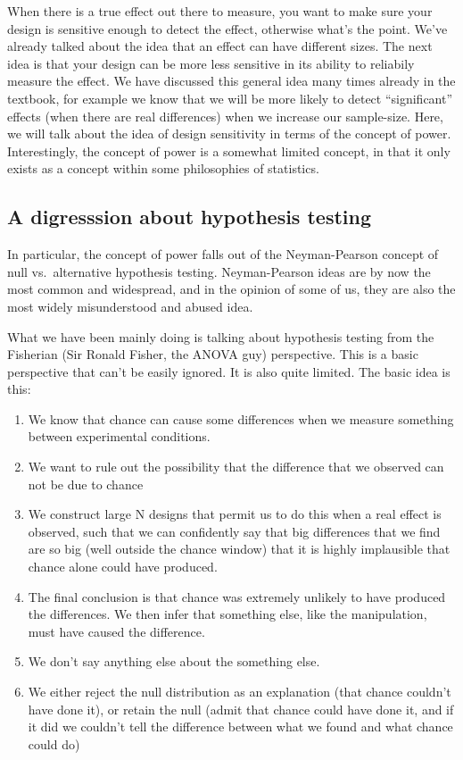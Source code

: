 \documentclass[
  letterpaper,
  DIV=11,
  numbers=noendperiod]{scrreprt}
\providecommand{\tightlist}{%
  \setlength{\itemsep}{0pt}\setlength{\parskip}{0pt}}\usepackage{longtable,booktabs,array}
\begin{document}
When there is a true effect out there to measure, you want to make sure
your design is sensitive enough to detect the effect, otherwise what's
the point. We've already talked about the idea that an effect can have
different sizes. The next idea is that your design can be more less
sensitive in its ability to reliabily measure the effect. We have
discussed this general idea many times already in the textbook, for
example we know that we will be more likely to detect ``significant''
effects (when there are real differences) when we increase our
sample-size. Here, we will talk about the idea of design sensitivity in
terms of the concept of power. Interestingly, the concept of power is a
somewhat limited concept, in that it only exists as a concept within
some philosophies of statistics.

\subsection{A digresssion about hypothesis
testing}\label{a-digresssion-about-hypothesis-testing}

In particular, the concept of power falls out of the Neyman-Pearson
concept of null vs.~alternative hypothesis testing. Neyman-Pearson ideas
are by now the most common and widespread, and in the opinion of some of
us, they are also the most widely misunderstood and abused idea.

What we have been mainly doing is talking about hypothesis testing from
the Fisherian (Sir Ronald Fisher, the ANOVA guy) perspective. This is a
basic perspective that can't be easily ignored. It is also quite
limited. The basic idea is this:

\begin{enumerate}
\def\labelenumi{\arabic{enumi}.}
\tightlist
\item
  We know that chance can cause some differences when we measure
  something between experimental conditions.
\item
  We want to rule out the possibility that the difference that we
  observed can not be due to chance
\item
  We construct large N designs that permit us to do this when a real
  effect is observed, such that we can confidently say that big
  differences that we find are so big (well outside the chance window)
  that it is highly implausible that chance alone could have produced.
\item
  The final conclusion is that chance was extremely unlikely to have
  produced the differences. We then infer that something else, like the
  manipulation, must have caused the difference.
\item
  We don't say anything else about the something else.
\item
  We either reject the null distribution as an explanation (that chance
  couldn't have done it), or retain the null (admit that chance could
  have done it, and if it did we couldn't tell the difference between
  what we found and what chance could do)
\end{enumerate}
\end{document}
